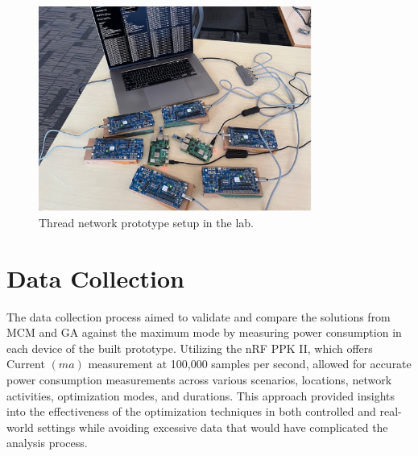 \begin{figure}[H]
    \centering
    \includegraphics[width=0.8\textwidth]{images/research_design/prototype_setup.jpg}
    \caption{Thread network prototype setup in the lab.}
    \label{fig:prototype_setup}
\end{figure}

\section{Data Collection}

The data collection process aimed to validate and compare the solutions from \gls{MCM} and \gls{GA} against the maximum mode by measuring power consumption in each device of the built prototype. Utilizing the \gls{nRF} \gls{PPK} II, which offers Current $\left(ma\right)$ measurement at 100,000 samples per second, allowed for accurate power consumption measurements across various scenarios, locations, network activities, optimization modes, and durations. This approach provided insights into the effectiveness of the optimization techniques in both controlled and real-world settings while avoiding excessive data that would have complicated the analysis process.

